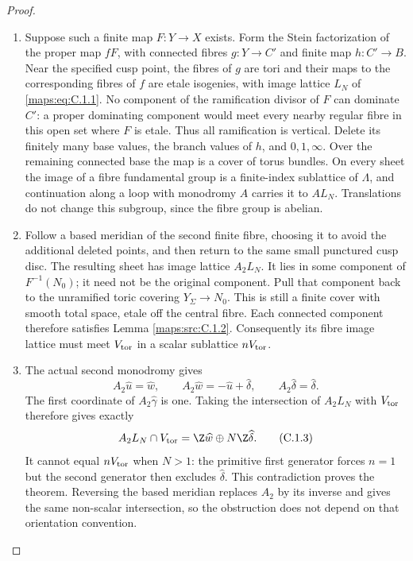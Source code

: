 \begin{proof}
\begin{enumerate}[label=\arabic*.,leftmargin=*]
\item Suppose such a finite map $F:Y\to X$ exists. Form the Stein factorization
of the proper map $fF$, with connected fibres $g:Y\to C'$ and finite map
$h:C'\to B$. Near the specified cusp point, the fibres of $g$ are tori
and their maps to the corresponding fibres of $f$ are etale isogenies,
with image lattice $L_N$ of \eqref{maps:eq:C.1.1}. No component of the ramification
divisor of $F$ can dominate $C'$: a proper dominating component would
meet every nearby regular fibre in this open set where $F$ is etale.
Thus all ramification is vertical. Delete its finitely many base values,
the branch values of $h$, and $0,1,\infty$. Over the remaining connected
base the map is a cover of torus bundles. On every sheet the image
of a fibre fundamental group is a finite-index sublattice of $\Lambda$,
and continuation along a loop with monodromy $A$ carries it to $AL_N$.
Translations do not change this subgroup, since the fibre group is abelian.

\item Follow a based meridian of the second finite fibre, choosing it to avoid
the additional deleted points, and then return to the same small
punctured cusp disc. The resulting sheet has image lattice $A_2L_N$.
It lies in some component of $F^{-1}(N_0)$; it need not be the original
component. Pull that component back to the unramified toric covering
$Y_\Sigma\to N_0$. This is still a finite cover with smooth total space,
etale off the central fibre. Each connected component therefore satisfies
Lemma \ref{maps:src:C.1.2}. Consequently its fibre image lattice must meet
$V_{\rm tor}$ in a scalar sublattice $nV_{\rm tor}$.

\item The actual second monodromy gives
\[
 A_2\widehat u=\widehat w,\qquad
 A_2\widehat w=-\widehat u+\widehat\delta,\qquad
 A_2\widehat\delta=\widehat\delta.
\]
The first coordinate of $A_2\widehat\gamma$ is one. Taking the
intersection of $A_2L_N$ with $V_{\rm tor}$ therefore gives exactly
\[
 A_2L_N\cap V_{\rm tor}
   =\Z\widehat w\oplus N\Z\widehat\delta.
 \tag{C.1.3}\label{maps:eq:C.1.3}
\]
It cannot equal $nV_{\rm tor}$ when $N>1$: the primitive first generator
forces $n=1$ but the second generator then excludes
$\widehat\delta$. This contradiction proves the theorem. Reversing the
based meridian replaces $A_2$ by its inverse and gives the same
non-scalar intersection, so the obstruction does not depend on that
orientation convention.
\end{enumerate}
\end{proof}

